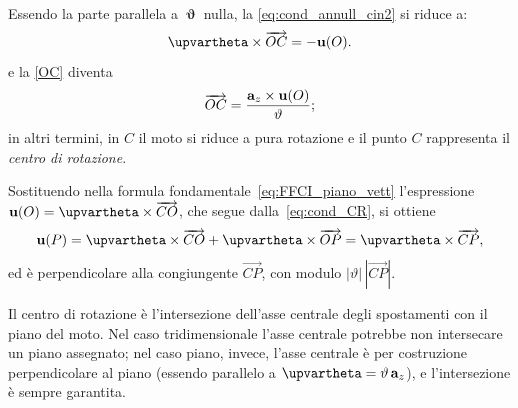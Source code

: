 Essendo la parte parallela a $\bm{\upvartheta}$ nulla, la \eqref{eq:cond_annull_cin2}
si riduce a:
%
%
%
%
\begin{equation}\label{eq:cond_CR}
	\bm{\upvartheta} \times \overrightarrow{OC} = -\ub(O).
\end{equation}
e la \eqref{OC}  diventa
\begin{equation}\label{eq:vettore_OC}
	\overrightarrow{OC}
	= \frac{\mathbf{a}_z \times \mathbf{u}(O)}{\vartheta};
\end{equation}
in altri termini, in $C$ il moto si riduce a pura rotazione e il punto $C$ rappresenta il \textit{centro di rotazione}. 



Sostituendo
nella formula fondamentale~\eqref{eq:FFCI_piano_vett}
l'espressione
$\ub(O) = \bm{\upvartheta} \times \overrightarrow{CO}$,
che segue dalla~\eqref{eq:cond_CR}, si ottiene
\begin{equation}
	\ub(P) = \bm{\upvartheta} \times \overrightarrow{CO}
	+ \bm{\upvartheta} \times \overrightarrow{OP}
	= \bm{\upvartheta} \times \overrightarrow{CP},
\end{equation}
ed è perpendicolare alla congiungente $\overrightarrow{CP}$,
con modulo $|\vartheta|\,|\overrightarrow{CP}|$.


Il centro di rotazione è l'intersezione dell'asse centrale degli
spostamenti con il piano del moto. Nel caso tridimensionale
l'asse centrale potrebbe non intersecare un piano assegnato; nel
caso piano, invece, l'asse centrale è per costruzione
perpendicolare al piano (essendo parallelo a
$\bm{\upvartheta} = \vartheta\,\ab_z$), e l'intersezione è
sempre garantita.

